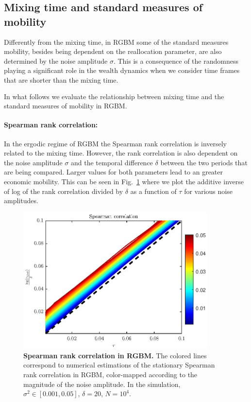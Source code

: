 \documentclass[11pt]{article}
\numberwithin{equation}{section}
\begin{document}
\subsection{Mixing time and standard measures of mobility}\label{sec:measures}

Differently from the mixing time, in RGBM some of the standard measures mobility, besides being dependent on the reallocation parameter, are also determined by the noise amplitude $\sigma$. This is a consequence of the randomness playing a significant role in the wealth dynamics when we consider time frames that are shorter than the mixing time. 

In what follows we evaluate the relationship between mixing time and the standard measures of mobility in RGBM.

\paragraph{Spearman rank correlation:} In the ergodic regime of RGBM the Spearman rank correlation is inversely related to the mixing time. However, the rank correlation is also dependent on the noise amplitude $\sigma$ and the temporal difference $\delta$ between the two periods that are being compared. Larger values for both parameters lead to an greater economic mobility. This can be seen in  Fig.~\ref{fig:rgbm-spearman-correlation} where we plot the additive inverse of log of the rank correlation divided by $\delta$ as a function of $\tau$ for various noise amplitudes.

\begin{figure}[t!]
\includegraphics[width=10cm]{figs/fig_spearman_rgbm.eps}
\caption{\textbf{Spearman rank correlation in RGBM.} The colored lines correspond to numerical estimations of the stationary Spearman rank correlation in RGBM, color-mapped according to the magnitude of the noise amplitude. In the simulation, $\sigma^2 \in \left[ 0.001, 0.05\right]$, $\delta = 20$, $N = 10^4$.\label{fig:rgbm-spearman-correlation}}
\end{figure}
\end{document}

